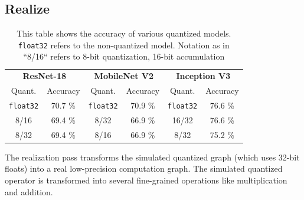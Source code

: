 \subsection{Realize}

\begin{table}[t]
  \begin{tabular}{|c|c||c|c||c|c|}
    \hline
    \multicolumn{2}{|c}{\textbf{ResNet-18}} & \multicolumn{2}{c}{\textbf{MobileNet V2}} & \multicolumn{2}{c|}{\textbf{Inception V3}} \\
    \multicolumn{1}{|c}{Quant.}    & \multicolumn{1}{c}{Accuracy}   &  \multicolumn{1}{c}{Quant.}  & \multicolumn{1}{c}{Accuracy}  & \multicolumn{1}{c}{Quant.}  & \multicolumn{1}{c|}{Accuracy} \\
    \hline
    \texttt{float32} & 70.7 \%    & \texttt{float32} & 70.9 \%       & \texttt{float32} & 76.6 \% \\
    8/16         & 69.4 \%    & 8/32         & 66.9 \%       & 16/32        & 76.6 \% \\
    8/32         & 69.4 \%    & 8/16         & 66.9 \%       & 8/32         & 75.2 \% \\
    \hline
  \end{tabular}
  \caption{This table shows the accuracy of various quantized models.
    \texttt{float32} refers to the non-quantized model.
    Notation as in ``8/16`` refers to 8-bit quantization,
    16-bit accumulation}
  \label{fig:quant_results}
\end{table}

The realization pass transforms the simulated quantized graph
  (which uses 32-bit floats)
  into a real low-precision computation graph.
The simulated quantized operator is transformed
  into several fine-grained operations like multiplication and addition.


